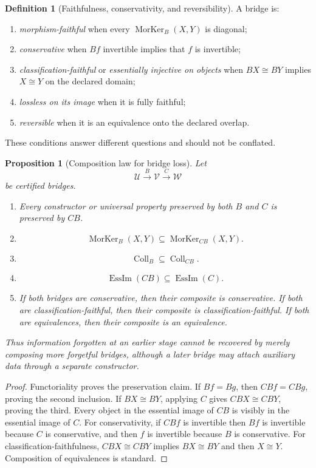 \documentclass[11pt]{article}
\newtheorem{proposition}[theorem]{Proposition}
\theoremstyle{definition}
\newtheorem{definition}[theorem]{Definition}
\theoremstyle{remark}
\begin{document}
\begin{definition}[Faithfulness, conservativity, and reversibility]
\label{def:lossless-bridge}
A bridge is:
\begin{enumerate}[label=\textup{(\roman*)}]
\item \emph{morphism-faithful} when every \(\operatorname{MorKer}_B(X,Y)\) is diagonal;
\item \emph{conservative} when \(Bf\) invertible implies that \(f\) is invertible;
\item \emph{classification-faithful} or \emph{essentially injective on objects} when \(BX\cong BY\) implies \(X\cong Y\) on the declared domain;
\item \emph{lossless on its image} when it is fully faithful;
\item \emph{reversible} when it is an equivalence onto the declared overlap.
\end{enumerate}
These conditions answer different questions and should not be conflated.
\end{definition}

\begin{proposition}[Composition law for bridge loss]
\label{prop:bridge-loss-composition}
Let
\[
\mathcal U\xrightarrow{B}\mathcal V\xrightarrow{C}\mathcal W
\]
be certified bridges.
\begin{enumerate}[label=\textup{(\roman*)}]
\item Every constructor or universal property preserved by both \(B\) and \(C\) is preserved by \(CB\).
\item
\[
\operatorname{MorKer}_B(X,Y)
\subseteq
\operatorname{MorKer}_{CB}(X,Y).
\]
\item
\[
\operatorname{Coll}_B
\subseteq
\operatorname{Coll}_{CB}.
\]
\item
\[
\operatorname{EssIm}(CB)
\subseteq
\operatorname{EssIm}(C).
\]
\item If both bridges are conservative, then their composite is conservative.  If both are classification-faithful, then their composite is classification-faithful.  If both are equivalences, then their composite is an equivalence.
\end{enumerate}
Thus information forgotten at an earlier stage cannot be recovered by merely composing more forgetful bridges, although a later bridge may attach auxiliary data through a separate constructor.
\end{proposition}

\begin{proof}
Functoriality proves the preservation claim.  If \(Bf=Bg\), then \(CBf=CBg\), proving the second inclusion.  If \(BX\cong BY\), applying \(C\) gives \(CBX\cong CBY\), proving the third.  Every object in the essential image of \(CB\) is visibly in the essential image of \(C\).  For conservativity, if \(CBf\) is invertible then \(Bf\) is invertible because \(C\) is conservative, and then \(f\) is invertible because \(B\) is conservative.  For classification-faithfulness, \(CBX\cong CBY\) implies \(BX\cong BY\) and then \(X\cong Y\).  Composition of equivalences is standard.
\end{proof}
\end{document}
